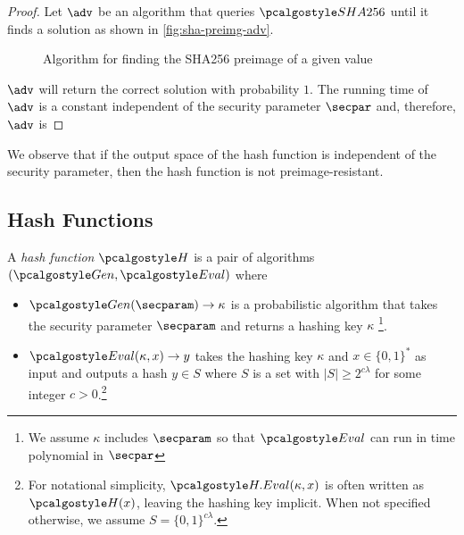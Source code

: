 \begin{proof}
  Let $\adv$ be an algorithm that queries $\algo{SHA256}$ until it finds a solution as shown in \autoref{fig:sha-preimg-adv}.
  \begin{figure}[tbhp]
  \begin{center}
    \begin{tcolorbox}[width=5cm]
      \begin{pchstack}[center]
      \end{pchstack}
    \end{tcolorbox}
  \end{center}
  \caption{Algorithm for finding the SHA256 preimage of a given value \label{fig:sha-preimg-adv}}
  \end{figure}
  $\adv$ will return the correct solution with probability $1$.
  The running time of $\adv$ is a constant independent of the security parameter $\secpar$ and, therefore, $\adv$ is \ppt
\end{proof}


We observe that if the output space of the hash function is independent of the security parameter, then the hash function is not preimage-resistant.

\subsection{Hash Functions}

\begin{definition}
  A \emph{hash function} $\algo{H}$ is a pair of \ppt algorithms $(\algo{Gen}, \algo{Eval})$ where
  \begin{itemize}
  \item $\algo{Gen}(\secparam) \rightarrow \kappa$ is a probabilistic algorithm that takes the security parameter $\secparam$ and returns a hashing key $\kappa$ \footnote{We assume $\kappa$ includes $\secparam$ so that $\algo{Eval}$ can run in time polynomial in $\secpar$}.
  \item $\algo{Eval}(\kappa, x) \rightarrow y$ takes the hashing key $\kappa$ and $x\in \{0,1\}^*$ as input and outputs a hash $y\in S$ where $S$ is a set with $|S| \geq 2^{c\lambda}$ for some integer $c > 0$.\footnote{For notational simplicity, $\algo{H.Eval}(\kappa, x)$ is often written as $\algo{H}(x)$, leaving the hashing key implicit. When not specified otherwise, we assume $S = \{0,1\}^{c\lambda}$.}
  \end{itemize}
\end{definition}

